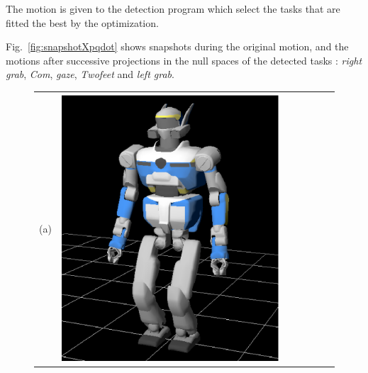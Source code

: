 \documentclass[letterpaper, 10pt, conference]{ieeeconf}      %
\begin{document}
The motion is given to the detection program
which select the tasks that are fitted the best by the optimization.

Fig.~\ref{fig:snapshotXpqdot} shows snapshots during the original motion,
and the motions after successive projections
in the null spaces of the detected
tasks : \emph{right grab}, \emph{Com}, \emph{gaze}, \emph{Twofeet} and \emph{left grab}.
\begin{figure}[t]
\centering
\begin{tabular}{c@{}c@{}c@{}c@{}c@{}c@{}c}
(a)&
\parbox[c]{2.4cm}{\includegraphics[width=\linewidth]{img/Pqdot0_0.png.ps}} &

\end{tabular}
\end{figure}
\end{document}
